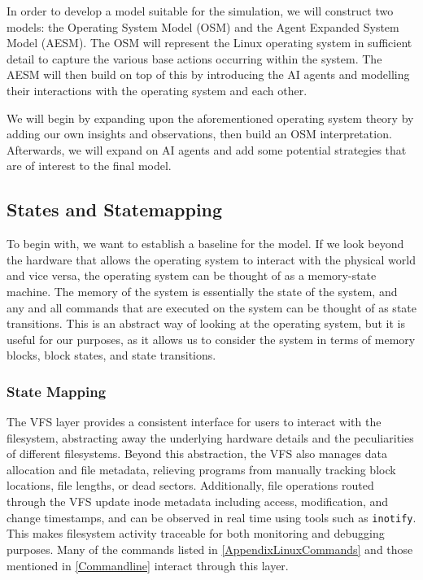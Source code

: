 In order to develop a model suitable for the simulation, we will construct two models: the Operating System Model (OSM) and the Agent Expanded System Model (AESM). The OSM will represent the Linux operating system in sufficient detail to capture the various base actions occurring within the system. The AESM will then build on top of this by introducing the AI agents and modelling their interactions with the operating system and each other.

We will begin by expanding upon the aforementioned operating system theory by adding our own insights and observations, then build an OSM interpretation. Afterwards, we will expand on AI agents and add some potential strategies that are of interest to the final model.

\subsection{States and Statemapping}
\label{StatesAndStatemapping}

To begin with, we want to establish a baseline for the model. If we look beyond the hardware that allows the operating system to interact with the physical world and vice versa, the operating system can be thought of as a memory-state machine. The memory of the system is essentially the state of the system, and any and all commands that are executed on the system can be thought of as state transitions. This is an abstract way of looking at the operating system, but it is useful for our purposes, as it allows us to consider the system in terms of memory blocks, block states, and state transitions.

\subsubsection{State Mapping}
\label{StateMapping}

The VFS layer provides a consistent interface for users to interact with the filesystem, abstracting away the underlying hardware details and the peculiarities of different filesystems. Beyond this abstraction, the VFS also manages data allocation and file metadata, relieving programs from manually tracking block locations, file lengths, or dead sectors. Additionally, file operations routed through the VFS update inode metadata including access, modification, and change timestamps, and can be observed in real time using tools such as \texttt{inotify}. This makes filesystem activity traceable for both monitoring and debugging purposes. Many of the commands listed in \autoref{AppendixLinuxCommands} and those mentioned in \autoref{Commandline} interact through this layer.

